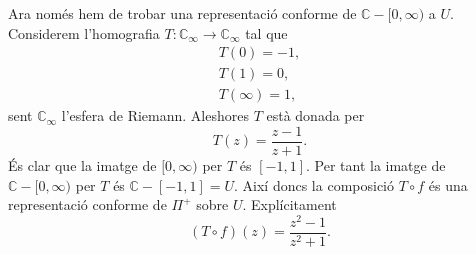 \documentclass[12pt]{article}
\numberwithin{table}{section}
\numberwithin{figure}{section}
\numberwithin{equation}{section}
\newcommand{\C}{\mathbb{C}}
\begin{document}
Ara només hem de trobar una representació conforme de \( \C - [0, \infty) \) a \( U \). Considerem l'homografia \( T \colon \C_\infty \to \C_\infty \) tal que 
\begin{gather*}
	T(0) = -1, \\
	T(1) = 0, \\
	T(\infty) = 1,
\end{gather*}
sent \( \C_\infty \) l'esfera de Riemann. Aleshores \( T \) està donada per
\begin{equation*}
	T(z) = \frac{z - 1}{z + 1}.
\end{equation*}
És clar que la imatge de \( [0, \infty) \) per \( T \) és \( [-1, 1] \). Per tant la imatge de \( \C - [0, \infty) \) per \( T \) és \( \C - [-1, 1] = U \). Així doncs la composició \( T \circ f \) és una representació conforme de \( \Pi^+ \) sobre \( U \). Explícitament
\begin{equation*}
	(T \circ f)(z) = \frac{z^2 - 1}{z^2 + 1}.
\end{equation*}
\end{document}

